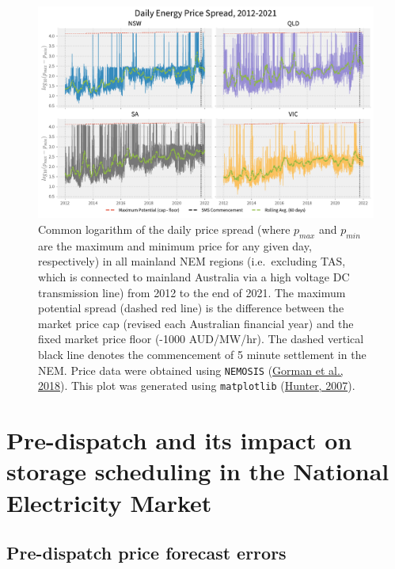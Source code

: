 \documentclass[12pt,a4paper,]{report}
\begin{document}
\begin{figure}
\hypertarget{fig:nem_daily_price_spreads}{%
\centering
\includegraphics{source/figures/historical_daily_price_spreads.pdf}
\caption[Daily price spread in all mainland NEM regions from 2012 to the
end of 2021]{Common logarithm of the daily price spread (where
\(p_{max}\) and \(p_{min}\) are the maximum and minimum price for any
given day, respectively) in all mainland NEM regions (i.e.~excluding
TAS, which is connected to mainland Australia via a high voltage DC
transmission line) from 2012 to the end of 2021. The maximum potential
spread (dashed red line) is the difference between the market price cap
(revised each Australian financial year) and the fixed market price
floor (-1000 AUD/MW/hr). The dashed vertical black line denotes the
commencement of 5 minute settlement in the NEM. Price data were obtained
using \texttt{NEMOSIS}
(\protect\hyperlink{ref-gormanNEMOSISNEMOpen2018}{Gorman et al., 2018}).
This plot was generated using \texttt{matplotlib}
(\protect\hyperlink{ref-hunterMatplotlib2DGraphics2007}{Hunter,
2007}).}\label{fig:nem_daily_price_spreads}
}
\end{figure}

\hypertarget{sec:info-case_study}{%
\section{Pre-dispatch and its impact on storage scheduling in the
National Electricity Market}\label{sec:info-case_study}}

\hypertarget{sec:info-case_study-price_forecast_errors}{%
\subsection{Pre-dispatch price forecast
errors}\label{sec:info-case_study-price_forecast_errors}}
\end{document}
